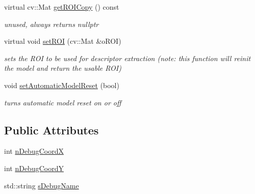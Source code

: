\begin{DoxyCompactItemize}
virtual cv\+::\+Mat \mbox{\hyperlink{class_background_subtractor_l_b_s_p_a9843f87f8adcd0e85274303f9210b883}{get\+R\+O\+I\+Copy}} () const
\begin{DoxyCompactList}\small\item\em unused, always returns nullptr \end{DoxyCompactList}\item 
virtual void \mbox{\hyperlink{class_background_subtractor_l_b_s_p_a34dc38d3d925d46d289c750786f232dc}{set\+R\+OI}} (cv\+::\+Mat \&o\+R\+OI)
\begin{DoxyCompactList}\small\item\em sets the R\+OI to be used for descriptor extraction (note\+: this function will reinit the model and return the usable R\+OI) \end{DoxyCompactList}\item 
void \mbox{\hyperlink{class_background_subtractor_l_b_s_p_a31b8474f8b4ffa6ef08ec682cfcef9b0}{set\+Automatic\+Model\+Reset}} (bool)
\begin{DoxyCompactList}\small\item\em turns automatic model reset on or off \end{DoxyCompactList}\end{DoxyCompactItemize}
\subsection*{Public Attributes}
\begin{DoxyCompactItemize}
\item 
int \mbox{\hyperlink{class_background_subtractor_l_b_s_p_a49771cd7b2c8354cde3da6e593d3febe}{n\+Debug\+CoordX}}
\item 
int \mbox{\hyperlink{class_background_subtractor_l_b_s_p_a8e1451fd90eb4459aa84ea5e7133268a}{n\+Debug\+CoordY}}
\item 
std\+::string \mbox{\hyperlink{class_background_subtractor_l_b_s_p_ada55b4a5eec8c82d0e05b0f9f1600ecb}{s\+Debug\+Name}}
\end{DoxyCompactItemize}
